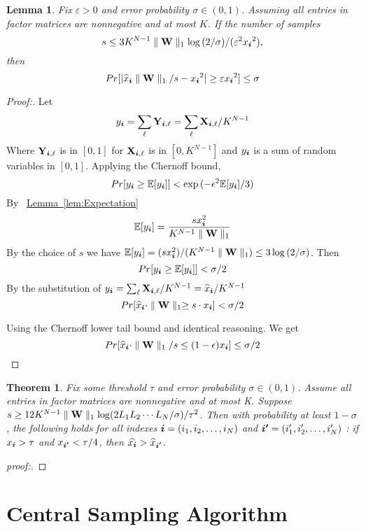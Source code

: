 \documentclass{article}
\newcommand{\V}[1]{{\bm{{\MakeLowercase{#1}}}}}
\newcommand{\M}[1]{{\bm{\mathbf{\MakeUppercase{#1}}}}}
\newcommand{\norm}[2]{\parallel#1\parallel_{#2}}
\newcommand{\Lem}[1] {\hyperref[lem:#1] {Lemma~\ref*{lem:#1}}} %
\newtheorem{lemma}{Lemma}[section]
\newtheorem{theorem}{Theorem}[section]
\begin{document}
\begin{lemma}\label{lem:Bound}
Fix $\varepsilon > 0$ and error probability $\sigma \in (0,1)$. Assuming all entries in factor matrices are nonnegative and at most $K$. If the number of samples
\[
s \leq 3K^{N-1}\norm{\M{W}}{1}\log{(2/\sigma)}/(\varepsilon ^2{x_{\V{i}}}^2),
\]
then
\[
Pr[|{\widehat{x}_{\V{i}}}\norm{\M{W}}{1}/s-{x_{\V{i}}}^2| \geq \varepsilon{x_{\V{i}}}^2] \leq \sigma
\]
\end{lemma}

\begin{proof}[Proof:]
Let
\[
    y_{\V{i}} = \sum_{\ell}\M{Y}_{\V{i},\ell} = \sum_{\ell}\M{X}_{\V{i},\ell}/K^{N-1}
\]
Where $\M{Y}_{\V{i},\ell}$ is in $[0,1]$ for $\M{X}_{\V{i},\ell}$ is in $[0,K^{N-1}]$ and $y_{\V{i}}$ is a sum of random variables in $[0,1]$.
Applying the Chernoff bound,
\[
Pr[y_{\V{i}} \geq \mathbb{E}[y_{\V{i}}]] < \exp{(-\epsilon^2\mathbb{E}[y_{\V{i}}]/3)}
\]
By ~\Lem{Expectation}
\[
\mathbb{E}[y_{\V{i}}] = \frac{sx^2_{\V{i}}}{K^{N-1}\norm{\M{W}}{1}}
\]
By the choice of $s$ we have $\mathbb{E}[y_{\V{i}}]=(sx^2_{\V{i}})/(K^{N-1}\norm{\M{W}}{1}) \leq 3\log{(2/\sigma)}$. Then
\[
Pr[y_{\V{i}} \geq \mathbb{E}[y_{\V{i}}]] < \sigma/2
\]
By the substitution of $y_{\V{i}}=\sum_{\ell}\M{X}_{\V{i},\ell}/K^{N-1}=\widehat{x}_{\V{i}}/K^{N-1}$
\[
Pr[\widehat{x}_{\V{i}}\cdot\norm{\M{W}}{1} \geq s\cdot x_{\V{i}}] < \sigma/2
\]

Using the Chernoff lower tail bound and identical reasoning. We get
\[
Pr[\widehat{x}_{\V{i}}\cdot\norm{\M{W}}{1}/s \leq (1-\epsilon)x_{\V{i}}] \leq \sigma/2
\]
\end{proof}

\begin{theorem}\label{theo:Order}
Fix some threshold $\tau$ and error probability $\sigma\in(0,1)$. Assume all entries in factor matrices are nonnegative and at most  K. Suppose $s \geq 12K^{N-1}\norm{\M{W}}{1}\log(2L_1L_2\cdots L_N/\sigma)/{\tau^2}$. Then with probability at least $1-\sigma$, the following holds for all indexes $\V{i} = (i_1,i_2,\ldots,i_N)$ and $\V{i'} = (i'_1,i'_2,\ldots,i'_N)$ : if $x_{\V{i}}>\tau$ and $ x_{\V{i'}} < \tau/4$, then $\widehat{x_{\V{i}}}>\widehat{x}_{\V{i'}}$.
\end{theorem}

\begin{proof}[proof:]

\end{proof}


\section{Central Sampling Algorithm}
\end{document}
